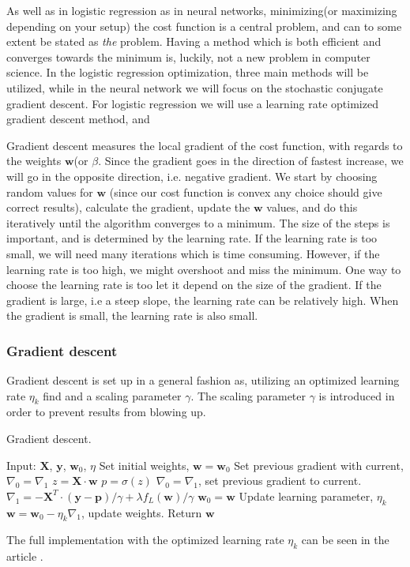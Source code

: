 
As well as in logistic regression as in neural networks, minimizing(or maximizing depending on your setup) the cost function is a central problem, and can to some extent be stated as \textit{the} problem. Having a method which is both efficient and converges towards the minimum is, luckily, not a new problem in computer science. In the logistic regression optimization, three main methods will be utilized, while in the neural network we will focus on the stochastic conjugate gradient descent. For logistic regression we will use a learning rate optimized gradient descent method, and 


Gradient descent measures the local gradient of the cost function, with regards to the weights $\bm{w}$(or $\beta$. Since the gradient goes in the direction of fastest increase, we will go in the opposite direction, i.e. negative gradient. We start by choosing random values for $\bm{w}$ (since our cost function is convex any choice should give correct results), calculate the gradient, update the $\bm{w}$ values, and do this iteratively until the algorithm converges to a minimum. The size of the steps is important, and is determined by the learning rate. If the learning rate is too small, we will need many iterations which is time consuming. However, if the learning rate is too high, we might overshoot and miss the minimum. One way to choose the learning rate is too let it depend on the size of the gradient. If the gradient is large, i.e a steep slope, the learning rate can be relatively high. When the gradient is small, the learning rate is also small.

\subsubsection{Gradient descent}
Gradient descent is set up in a general fashion as, utilizing an optimized learning rate $\eta_k$ find and a scaling parameter $\gamma$. The scaling parameter $\gamma$ is introduced in order to prevent results from blowing up.
\begin{algorithm}[H]
    \caption{Gradient descent.}
    \label{alg:gd}
    \begin{algorithmic}[1]
        \State Input: $\bm{X}$, $\bm{y}$, $\bm{w}_0$, $\eta$
        \State Set initial weights, $\bm{w} = \bm{w}_0$
        \State Set previous gradient with current, $\nabla_0 = \nabla_1$
            \State $z = \bm{X}\cdot \bm{w}$
            \State $p = \sigma(z)$
            \State $\nabla_0 = \nabla_1$, set previous gradient to current.
            \State $\nabla_1 = - \bm{X}^T \cdot (\bm{y} - \bm{p}) / \gamma + \lambda f_L(\bm{w}) / \gamma$
            \State $\bm{w}_0 = \bm{w}$
            \State Update learning parameter, $\eta_k$
            \State $\bm{w} = \bm{w}_0 - \eta_k \nabla_1$, update weights.
        \EndWhile
        \State Return $\bm{w}$
    \end{algorithmic}
\end{algorithm}
The full implementation with the optimized learning rate $\eta_k$ can be seen in the article \citet{optimal-learning-rate}.

